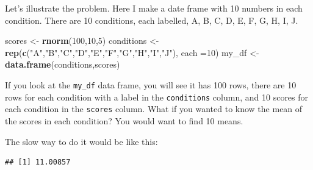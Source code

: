\documentclass[
]{book}
\newenvironment{Shaded}{\begin{snugshade}}{\end{snugshade}}
\newcommand{\AttributeTok}[1]{\textcolor[rgb]{0.13,0.29,0.53}{#1}}
\newcommand{\DecValTok}[1]{\textcolor[rgb]{0.00,0.00,0.81}{#1}}
\newcommand{\FunctionTok}[1]{\textcolor[rgb]{0.13,0.29,0.53}{\textbf{#1}}}
\newcommand{\NormalTok}[1]{#1}
\newcommand{\OtherTok}[1]{\textcolor[rgb]{0.56,0.35,0.01}{#1}}
\newcommand{\SpecialCharTok}[1]{\textcolor[rgb]{0.81,0.36,0.00}{\textbf{#1}}}
\newcommand{\StringTok}[1]{\textcolor[rgb]{0.31,0.60,0.02}{#1}}
\begin{document}
Let's illustrate the problem. Here I make a date frame with 10 numbers in each condition. There are 10 conditions, each labelled, A, B, C, D, E, F, G, H, I, J.

\begin{Shaded}
\begin{Highlighting}[]
\NormalTok{scores }\OtherTok{\textless{}{-}} \FunctionTok{rnorm}\NormalTok{(}\DecValTok{100}\NormalTok{,}\DecValTok{10}\NormalTok{,}\DecValTok{5}\NormalTok{)}
\NormalTok{conditions }\OtherTok{\textless{}{-}} \FunctionTok{rep}\NormalTok{(}\FunctionTok{c}\NormalTok{(}\StringTok{"A"}\NormalTok{,}\StringTok{"B"}\NormalTok{,}\StringTok{"C"}\NormalTok{,}\StringTok{"D"}\NormalTok{,}\StringTok{"E"}\NormalTok{,}\StringTok{"F"}\NormalTok{,}\StringTok{"G"}\NormalTok{,}\StringTok{"H"}\NormalTok{,}\StringTok{"I"}\NormalTok{,}\StringTok{"J"}\NormalTok{), }\AttributeTok{each =}\DecValTok{10}\NormalTok{)}
\NormalTok{my\_df }\OtherTok{\textless{}{-}} \FunctionTok{data.frame}\NormalTok{(conditions,scores)}
\end{Highlighting}
\end{Shaded}

If you look at the \texttt{my\_df} data frame, you will see it has 100 rows, there are 10 rows for each condition with a label in the \texttt{conditions} column, and 10 scores for each condition in the \texttt{scores} column. What if you wanted to know the mean of the scores in each condition? You would want to find 10 means.

The slow way to do it would be like this:

\begin{Shaded}
\end{Shaded}

\begin{verbatim}
## [1] 11.00857
\end{verbatim}

\begin{Shaded}
\end{Shaded}
\end{document}
